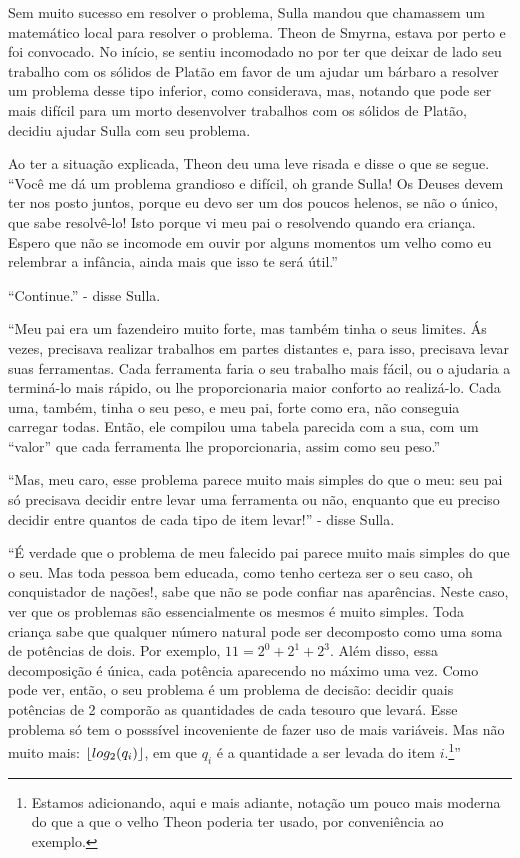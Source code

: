 \documentclass{article}
\begin{document}
Sem muito sucesso em resolver o problema, Sulla mandou que chamassem um matemático local para
resolver o problema. Theon de Smyrna, estava por perto e foi convocado. No início, se sentiu
incomodado no por ter que deixar de lado seu trabalho com os sólidos de Platão em favor de um
ajudar um bárbaro a resolver um problema desse tipo inferior, como considerava, mas,
notando que pode ser mais difícil para um morto desenvolver trabalhos com
os sólidos de Platão, decidiu ajudar Sulla com seu problema.

Ao ter a situação explicada, Theon deu uma leve risada e disse o que se segue. ``Você me dá um
problema grandioso e difícil, oh grande Sulla! Os Deuses devem ter nos posto juntos, porque eu devo
ser um dos poucos helenos, se não o único, que sabe resolvê-lo! Isto porque vi meu pai o resolvendo
quando era criança. Espero que não se incomode em ouvir por alguns momentos um velho como eu
relembrar a infância, ainda mais que isso te será útil.''

``Continue.'' - disse Sulla.

``Meu pai era um fazendeiro muito forte, mas também tinha o seus limites. Ás vezes, precisava
realizar trabalhos em partes distantes e, para isso, precisava levar suas ferramentas. Cada
ferramenta faria o seu trabalho mais fácil, ou o ajudaria a terminá-lo mais rápido, ou lhe
proporcionaria maior conforto ao realizá-lo. Cada uma, também, tinha o seu peso, e meu pai, forte
como era, não conseguia carregar todas. Então, ele compilou uma tabela parecida com a sua, com um
``valor'' que cada ferramenta lhe proporcionaria, assim como seu peso.''

``Mas, meu caro, esse problema parece muito mais simples do que o meu: seu pai só precisava decidir
entre levar uma ferramenta ou não, enquanto que eu preciso decidir entre quantos de cada tipo de
item levar!'' - disse Sulla.

``É verdade que o problema de meu falecido pai parece muito mais simples do que o seu. Mas toda
pessoa bem educada, como tenho certeza ser o seu caso, oh conquistador de nações!, sabe que não se pode confiar nas aparências.
Neste caso, ver que os problemas são essencialmente os mesmos é muito simples. Toda criança sabe que
qualquer número natural pode ser decomposto como uma soma de potências de dois. Por exemplo, $11 = 2^0
+ 2^1 + 2^3$. Além disso, essa decomposição é única, cada potência aparecendo no máximo uma vez.
Como pode ver, então, o seu problema é um problema de decisão: decidir quais potências de 2 comporão
as quantidades de cada tesouro que levará. Esse problema só tem o posssível incoveniente de fazer
uso de mais variáveis. Mas não muito mais: $\lfloor log_2(q_i)\rfloor$, em que $q_i$ é a quantidade a ser
levada do item $i$.\footnote{Estamos adicionando, aqui e mais adiante, notação um pouco mais moderna
  do que a que o velho Theon poderia ter usado, por conveniência ao exemplo.}''
\end{document}

